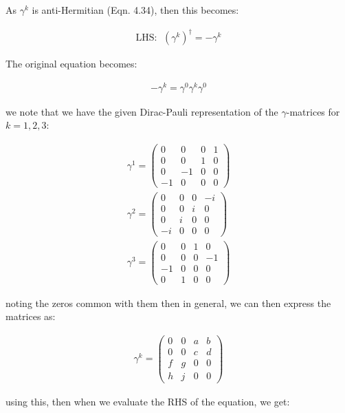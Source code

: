 \documentclass[11pt]{article}
\theoremstyle{definition}
\begin{document}
As $\gamma^{k}$ is anti-Hermitian (Eqn. 4.34), then this becomes:

\begin{align*}
    \text{LHS: }\; (\gamma^{k})^{\dagger} = -\gamma^{k}
\end{align*}

The original equation becomes:

\begin{align*}
    -\gamma^{k} = \gamma^{0}\gamma^{k}\gamma^{0}
\end{align*}

we note that we have the given Dirac-Pauli representation of the $\gamma$-matrices for $k=1,2,3$:

\begin{align*}
    \gamma^{1} = 
    \begin{pmatrix}
        0&0&0&1\\ 
        0&0&1&0\\ 
        0&-1&0&0\\ 
        -1&0&0&0
    \end{pmatrix}\\
    \gamma^{2} = 
    \begin{pmatrix}
        0&0&0&-i\\ 
        0&0&i&0\\ 
        0&i&0&0\\ 
        -i&0&0&0
    \end{pmatrix}\\
    \gamma^{3} = 
    \begin{pmatrix}
        0&0&1&0\\ 
        0&0&0&-1\\ 
        -1&0&0&0\\ 
        0&1&0&0
    \end{pmatrix}
\end{align*}

noting the zeros common with them then in general, we can then express the matrices as:

\begin{align*}
    \gamma^{k} =
    \begin{pmatrix}
        0&0&a&b\\ 
        0&0&c&d\\ 
        f&g&0&0\\ 
        h&j&0&0\end{pmatrix}
\end{align*}

using this, then when we evaluate the RHS of the equation, we get:
\end{document}
